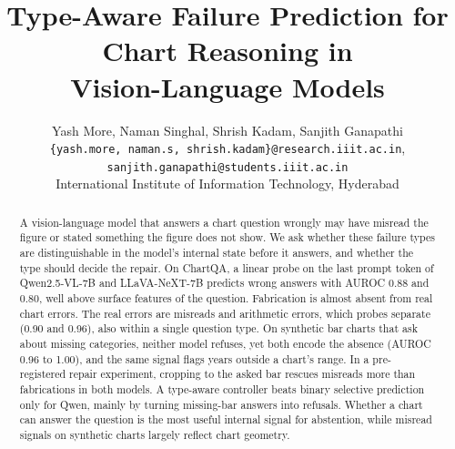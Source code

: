 \documentclass[11pt]{article}
\title{Type-Aware Failure Prediction for Chart Reasoning in\\Vision-Language Models}
\author{Yash More, Naman Singhal, Shrish Kadam, Sanjith Ganapathi \\
  \texttt{\{yash.more, naman.s, shrish.kadam\}@research.iiit.ac.in}, \texttt{sanjith.ganapathi@students.iiit.ac.in} \\
  International Institute of Information Technology, Hyderabad}
\begin{document}
\maketitle

\begin{abstract}
A vision-language model that answers a chart question wrongly may have misread
the figure or stated something the figure does not show. We ask whether these
failure types are distinguishable in the model's internal state before it
answers, and whether the type should decide the repair. On ChartQA, a linear
probe on the last prompt token of Qwen2.5-VL-7B and LLaVA-NeXT-7B predicts wrong
answers with AUROC 0.88 and 0.80, well above surface features of the question.
Fabrication is almost absent from real chart errors. The real errors are misreads
and arithmetic errors, which probes separate (0.90 and 0.96), also within a single
question type. On synthetic bar charts that ask about missing categories, neither
model refuses, yet both encode the absence (AUROC 0.96 to 1.00), and the same
signal flags years outside a chart's range. In a pre-registered repair
experiment, cropping to the asked bar rescues misreads more than fabrications in
both models. A type-aware controller beats binary selective prediction only for
Qwen, mainly by turning missing-bar answers into refusals. Whether a chart can
answer the question is the most useful internal signal for abstention, while
misread signals on synthetic charts largely reflect chart geometry.
\end{abstract}













\clearpage
\appendix

\end{document}
